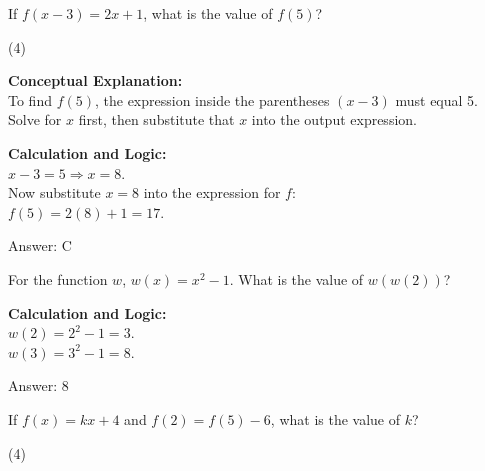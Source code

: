 \documentclass[11pt,paper=a4,answers]{exam}
\begin{document}
\begin{questions}
\vspace{40pt}

\question
If $f(x-3) = 2x + 1$, what is the value of $f(5)$?
\begin{tasks}(4)
\end{tasks}

\begin{solution}
\textbf{Conceptual Explanation:} \\
To find $f(5)$, the expression inside the parentheses $(x-3)$ must equal 5. Solve for $x$ first, then substitute that $x$ into the output expression.

\vspace{20pt}

\textbf{Calculation and Logic:} \\
$x - 3 = 5 \Rightarrow x = 8$. \\
Now substitute $x=8$ into the expression for $f$: \\
$f(5) = 2(8) + 1 = 17$.

\vspace{25pt}

Answer: \colorbox{yellow!100}{C}
\end{solution}

\vspace{40pt}

\question
For the function $w$, $w(x) = x^2 - 1$. What is the value of $w(w(2))$?

\begin{solution}
\textbf{Calculation and Logic:} \\
$w(2) = 2^2 - 1 = 3$. \\
$w(3) = 3^2 - 1 = 8$.

\vspace{25pt}

Answer: \colorbox{yellow!100}{8}
\end{solution}

\vspace{40pt}

\question
If $f(x) = kx + 4$ and $f(2) = f(5) - 6$, what is the value of $k$?
\begin{tasks}(4)
\end{tasks}


\end{questions}
\end{document}
